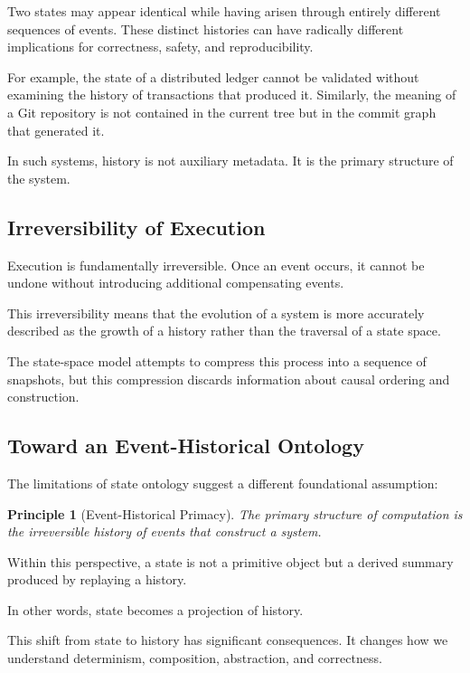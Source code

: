 \documentclass[12pt]{article}
\newtheorem{principle}{Principle}
\begin{document}
Two states may appear identical while having arisen through
entirely different sequences of events. These distinct histories
can have radically different implications for correctness,
safety, and reproducibility.

For example, the state of a distributed ledger cannot be validated
without examining the history of transactions that produced it.
Similarly, the meaning of a Git repository is not contained in the
current tree but in the commit graph that generated it.

In such systems, history is not auxiliary metadata.
It is the primary structure of the system.

\subsection{Irreversibility of Execution}

Execution is fundamentally irreversible. Once an event occurs,
it cannot be undone without introducing additional compensating
events.

This irreversibility means that the evolution of a system
is more accurately described as the growth of a history
rather than the traversal of a state space.

The state-space model attempts to compress this process into
a sequence of snapshots, but this compression discards
information about causal ordering and construction.

\subsection{Toward an Event-Historical Ontology}

The limitations of state ontology suggest a different
foundational assumption:

\begin{principle}[Event-Historical Primacy]
The primary structure of computation is the irreversible
history of events that construct a system.
\end{principle}

Within this perspective, a state is not a primitive object
but a derived summary produced by replaying a history.

In other words, state becomes a projection of history.

This shift from state to history has significant consequences.
It changes how we understand determinism, composition,
abstraction, and correctness.
\end{document}
